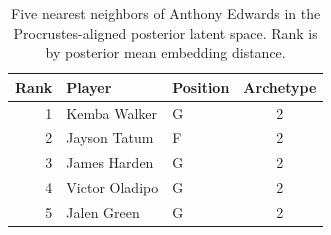 \begin{table}[htbp]
  \centering\small
  \begin{tabular}{rllc}
    \toprule
    Rank & Player & Position & Archetype \\
    \midrule
    1 & Kemba Walker & G & 2 \\
    2 & Jayson Tatum & F & 2 \\
    3 & James Harden & G & 2 \\
    4 & Victor Oladipo & G & 2 \\
    5 & Jalen Green & G & 2 \\
    \bottomrule
  \end{tabular}
  \caption{Five nearest neighbors of Anthony Edwards in the Procrustes-aligned posterior latent space. Rank is by posterior mean embedding distance.}
  \label{tab:Anthony_Edwards_neighbors}
\end{table}

